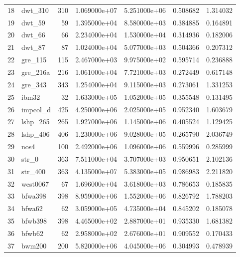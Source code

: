 \begin{tabular}{llrrrrr}
18 &             dwt\_310 &   310 &  1.069000e+07 &  5.251000e+06 &  0.508682 &   1.314032 \\
19 &              dwt\_59 &    59 &  1.395000e+04 &  8.580000e+03 &  0.384885 &   0.164891 \\
20 &              dwt\_66 &    66 &  2.234000e+04 &  1.530000e+04 &  0.314936 &   0.182006 \\
21 &              dwt\_87 &    87 &  1.024000e+04 &  5.077000e+03 &  0.504366 &   0.207312 \\
22 &             gre\_115 &   115 &  2.467000e+03 &  9.975000e+02 &  0.595714 &   0.236888 \\
23 &            gre\_216a &   216 &  1.061000e+04 &  7.721000e+03 &  0.272449 &   0.617148 \\
24 &             gre\_343 &   343 &  1.254000e+04 &  9.115000e+03 &  0.273061 &   1.331253 \\
25 &               ibm32 &    32 &  1.633000e+05 &  1.052000e+05 &  0.355548 &   0.131495 \\
26 &            impcol\_d &   425 &  4.250000e+06 &  2.025000e+05 &  0.952340 &   1.603679 \\
27 &            lshp\_265 &   265 &  1.927000e+06 &  1.145000e+06 &  0.405524 &   1.129425 \\
28 &            lshp\_406 &   406 &  1.230000e+06 &  9.028000e+05 &  0.265790 &   2.036749 \\
29 &                nos4 &   100 &  2.492000e+06 &  1.096000e+06 &  0.559996 &   0.285999 \\
30 &               str\_0 &   363 &  7.511000e+04 &  3.707000e+03 &  0.950651 &   2.102136 \\
31 &             str\_400 &   363 &  4.135000e+07 &  5.383000e+05 &  0.986983 &   2.211820 \\
32 &            west0067 &    67 &  1.696000e+04 &  3.618000e+03 &  0.786653 &   0.185835 \\
33 &             bfwa398 &   398 &  8.959000e+06 &  1.552000e+06 &  0.826792 &   1.788203 \\
34 &              bfwa62 &    62 &  3.059000e+05 &  4.735000e+04 &  0.845202 &   0.185078 \\
35 &             bfwb398 &   398 &  4.465000e+02 &  2.887000e+01 &  0.935330 &   1.681382 \\
36 &              bfwb62 &    62 &  2.958000e+02 &  2.676000e+01 &  0.909552 &   0.170433 \\
37 &              bwm200 &   200 &  5.820000e+06 &  4.045000e+06 &  0.304993 &   0.478939 \\

\end{tabular}
